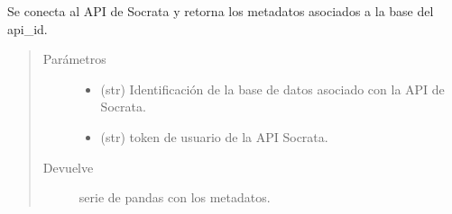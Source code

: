 \documentclass[letterpaper,10pt,openany,spanish]{sphinxmanual}
\begin{document}

\begin{fulllineitems}
\label{\detokenize{metadatos:metadatos.meta_show}}
Se conecta al API de Socrata y retorna los metadatos asociados a la base del api\_id.
\begin{quote}\begin{description}
\item[{Parámetros}] \leavevmode\begin{itemize}
\item {} 
 \textendash{} (str) Identificación de la base de datos asociado con la API de Socrata.

\item {} 
 \textendash{} (str)  \sphinxhyphen{} token de usuario de la API Socrata.

\end{itemize}

\item[{Devuelve}] \leavevmode
serie de pandas con los metadatos.

\end{description}\end{quote}

\end{fulllineitems}

\end{document}
